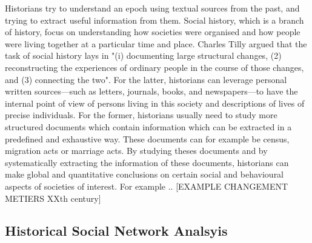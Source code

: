 Historians try to understand an epoch using textual sources from the past, and trying to extract useful information from them.
Social history, which is a branch of history, focus on understanding how societies were organised and how people were living together at a particular time and place. Charles Tilly argued that the task of social history lays in "(i) documenting large structural changes, (2) reconstructing the experiences of ordinary people in the course of those changes, and (3) connecting the two". For the latter, historians can leverage personal written sources---such as letters, journals, books, and newspapers---to have the internal point of view of persons living in this society and descriptions of lives of precise individuals.
For the former, historians usually need to study more structured documents which contain information which can be extracted in a predefined and exhaustive way. These documents can for example be census, migration acts or marriage acts. By studying theses documents and by systematically extracting the information of these documents, historians can make global and quantitative conclusions on certain social and behavioural aspects of societies of interest.
For example .. [EXAMPLE CHANGEMENT METIERS XXth century]



\subsection{Historical Social Network Analsyis}


